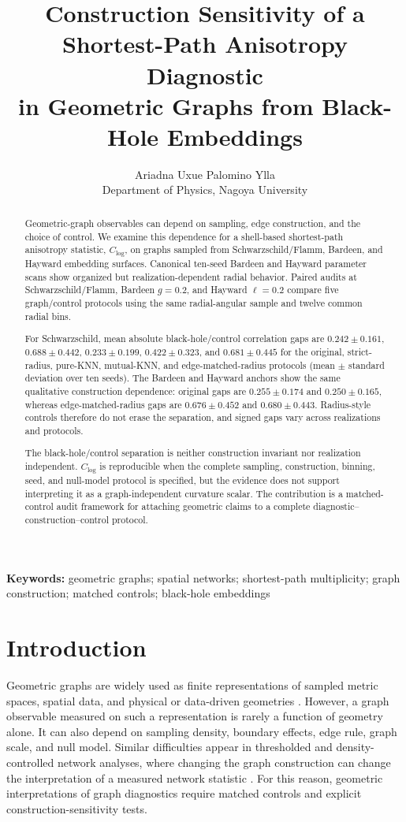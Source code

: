 \documentclass[11pt]{article}
\title{Construction Sensitivity of a Shortest-Path Anisotropy Diagnostic\\
in Geometric Graphs from Black-Hole Embeddings}
\author{Ariadna Uxue Palomino Ylla\\
Department of Physics, Nagoya University}
\date{}
\newcommand{\clog}{C_{\log}}
\begin{document}
\maketitle

\begin{abstract}
Geometric-graph observables can depend on sampling, edge construction, and the
choice of control. We examine this dependence for a shell-based shortest-path
anisotropy statistic, $\clog$, on graphs sampled from Schwarzschild/Flamm,
Bardeen, and Hayward embedding surfaces. Canonical ten-seed Bardeen and Hayward
parameter scans show organized but realization-dependent radial behavior.
Paired audits at Schwarzschild/Flamm, Bardeen $g=0.2$, and Hayward $\ell=0.2$
compare five graph/control protocols using the same radial-angular sample and
twelve common radial bins.

For Schwarzschild, mean absolute black-hole/control correlation gaps are
$0.242\pm0.161$, $0.688\pm0.442$, $0.233\pm0.199$,
$0.422\pm0.323$, and $0.681\pm0.445$ for the original, strict-radius,
pure-KNN, mutual-KNN, and edge-matched-radius protocols (mean $\pm$ standard
deviation over ten seeds). The Bardeen and Hayward anchors show the same
qualitative construction dependence: original gaps are $0.255\pm0.174$ and
$0.250\pm0.165$, whereas edge-matched-radius gaps are $0.676\pm0.452$ and
$0.680\pm0.443$. Radius-style controls therefore do not erase the separation,
and signed gaps vary across realizations and protocols.

The black-hole/control separation is neither construction invariant nor
realization independent. $\clog$ is reproducible when the complete sampling,
construction, binning, seed, and null-model protocol is specified, but the
evidence does not support interpreting it as a graph-independent curvature
scalar. The contribution is a matched-control audit framework for attaching
geometric claims to a complete diagnostic--construction--control protocol.
\end{abstract}

\noindent\textbf{Keywords:} geometric graphs; spatial networks; shortest-path multiplicity;
graph construction; matched controls; black-hole embeddings

\section{Introduction}

Geometric graphs are widely used as finite representations of sampled metric
spaces, spatial data, and physical or data-driven geometries
\cite{Penrose2003,DallChristensen2002,Newman2010}. However, a graph observable
measured on such a representation is rarely a function of geometry alone. It can
also depend on sampling density, boundary effects, edge rule, graph scale, and
null model. Similar difficulties appear in thresholded and density-controlled
network analyses, where changing the graph construction can change the
interpretation of a measured network statistic
\cite{VanWijk2010,Langer2013,Ginestet2011}. For this reason, geometric
interpretations of graph diagnostics require matched controls and explicit
construction-sensitivity tests.
\end{document}
